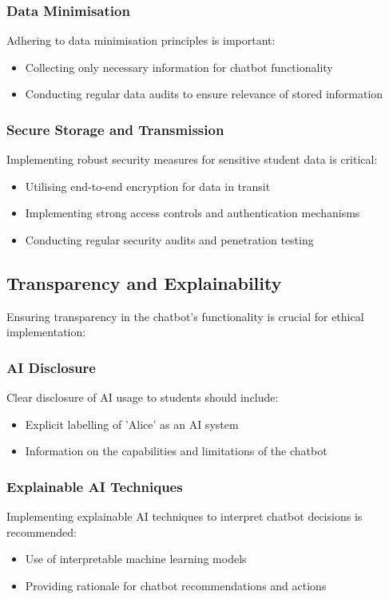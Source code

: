 \documentclass[15pt,a4paper]{article}
\begin{document}
\begin{multicols}{2}
\subsubsection*{Data Minimisation}
Adhering to data minimisation principles \textit{\parencite{A29WP2018}} is important:
\begin{itemize}
    \item Collecting only necessary information for chatbot functionality
    \item Conducting regular data audits to ensure relevance of stored information
\end{itemize}

\subsubsection*{Secure Storage and Transmission}
Implementing robust security measures for sensitive student data \textit{\parencite{NCSC2024}} is critical:
\begin{itemize}
    \item Utilising end-to-end encryption for data in transit
    \item Implementing strong access controls and authentication mechanisms
    \item Conducting regular security audits and penetration testing
\end{itemize}

\subsection{Transparency and Explainability}
Ensuring transparency in the chatbot's functionality is crucial for ethical implementation:

\subsubsection*{AI Disclosure}
Clear disclosure of AI usage to students \textit{\parencite{IEEE2023}} should include:
\begin{itemize}
    \item Explicit labelling of 'Alice' as an AI system
    \item Information on the capabilities and limitations of the chatbot
\end{itemize}

\subsubsection*{Explainable AI Techniques}
Implementing explainable AI techniques to interpret chatbot decisions \textit{\parencite[pp. 82-115]{Arrieta2022}} is recommended:
\begin{itemize}
    \item Use of interpretable machine learning models
    \item Providing rationale for chatbot recommendations and actions
\end{itemize}


\end{multicols}
\end{document}
